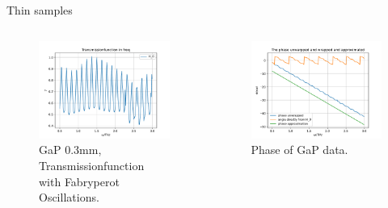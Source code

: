 \documentclass[aspectratio=1610, 9pt]{beamer}
\begin{document}
\begin{frame}{Thin samples}
  \begin{center}
    \begin{columns}
      \begin{column}{0.5\textwidth}
        \begin{figure}
        \includegraphics[width=\textwidth]{images/GAP/Transmissionfunction.pdf}
        \caption{GaP 0.3mm, Transmissionfunction with Fabryperot Oscillations.}
        \end{figure}
      \end{column}
      \begin{column}{0.5\textwidth}
        \begin{figure}
        \includegraphics[width=\textwidth]{images/GAP/THzPhase_approximation.pdf}
        \caption{Phase of GaP data.}
        \end{figure}
      \end{column}
    \end{columns}
  \end{center}
\end{frame}
\end{document}
